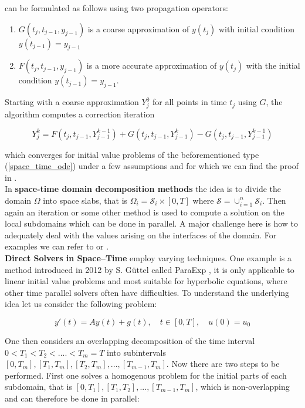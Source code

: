 \documentclass[../draft_1.tex]{subfiles}
\begin{document}
can be formulated as follows using two propagation operators:
\begin{enumerate}
	\item $G(t_j, t_{j-1}, y_{j-1})$ is a coarse approximation of $y(t_j)$ with initial condition $y(t_{j-1}) = y_{j-1} $
	\item $F(t_j, t_{j-1}, y_{j-1})$ is a more accurate approximation of $y(t_j)$ with the initial condition $y(t_{j-1}) = y_{j-1}$.
\end{enumerate}
Starting with a coarse approximation $Y_j^0$ for all points in time $t_j$ using $G$, the algorithm computes a correction iteration 
\begin{ceqn}
	\begin{equation}
	Y_{j}^{k} = F(t_j, t_{j-1}, Y_{j-1}^{k-1}) + G(t_j, t_{j-1}, Y_{j-1}^{k}) - G(t_j, t_{j-1}, Y_{j-1}^{k-1})
	\end{equation}
\end{ceqn}
which converges for initial value problems of the beforementioned type (\ref{space_time_ode}) under a few assumptions and for which we can find the proof in \cite{gander2008nonlinear}.
\smallskip
\\
In \textbf{space-time domain decomposition methods} the idea is to divide the domain $\Omega$ into space slabs, that is $\Omega_i = \mathcal{S}_i \times [0,T]$ where $\mathcal{S} = \cup_{i=1}^n \mathcal{S}_i$. Then again an iteration or some other method is used to compute a solution on the local subdomains which can be done in parallel. A major challenge here is how to adequately deal with the values arising on the interfaces of the domain. For examples we can refer to \cite{gander1996overlapping} or \cite{gander1999optimal}.
\smallskip
\\
\textbf{Direct Solvers in Space--Time} employ varying techniques. One example is a method introduced in 2012 by S. G\"uttel called ParaExp \cite{guttel2013parallel}, it is only applicable to linear initial value problems and most suitable for hyperbolic equations, where other time parallel solvers often have difficulties. To understand the underlying idea let us consider the following problem:
\begin{ceqn}
	\begin{equation}
	y'(t) = Ay(t) + g(t), \quad t \in [0,T], \quad u(0) = u_0
	\end{equation}
\end{ceqn}
One then considers an overlapping decomposition of the time interval $0 < T_1 < T_2 < .... < T_m = T$ into subintervals $[0, T_m], [T_1, T_m], [T_2, T_m], ..., [T_{m-1}, T_m]$. Now there are two steps to be performed. First one solves a homogenous problem for the initial parts of each subdomain, that is $[0,T_1], [T_1, T_2], ... , [T_{m-1}, T_m]$, which is non-overlapping and can therefore be done in parallel:
\end{document}
